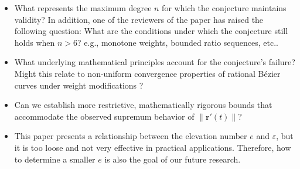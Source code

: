 \documentclass[preprint,12pt]{elsarticle}
\newcommand{\norm}[1]{\left\lVert #1 \right\rVert}
\begin{document}
\begin{itemize}
\item What represents the maximum degree $n$ for which the conjecture maintains validity? In addition, one of the reviewers of the paper has raised the following question:
What are the conditions under which the conjecture still holds when $n>6$?  e.g., monotone weights, bounded ratio sequences, etc..
\item What underlying mathematical principles account for the conjecture's failure? Might this relate to non-uniform convergence properties of rational Bézier curves under weight modifications \cite{Shi2005}?
\item Can we establish more restrictive, mathematically rigorous bounds that accommodate the observed supremum behavior of $\norm{\mathbf{r}'(t)}$?
\item This paper presents a relationship between the elevation number \(e\) and \(\varepsilon\), but it is too loose and not very effective in practical applications. Therefore, how to determine a smaller $e$ is also the goal of our future research.
\end{itemize}



 
\end{document}
